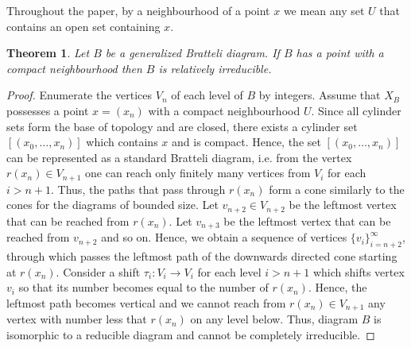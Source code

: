 \documentclass[11pt, twoside]{amsart}
\theoremstyle{definition}
\theoremstyle{remark}
\theoremstyle{plain}
\newtheorem{thm}[definition]{Theorem}
\numberwithin{equation}{section}
\begin{document}
Throughout the paper, by a neighbourhood of a point $x$ we mean any set $U$ that contains an open set containing $x$.

\begin{thm}\label{Thm:isomredus}
    Let $B$ be a generalized Bratteli diagram. 
    If $B$ has a point with a compact neighbourhood then $B$ is relatively irreducible. 
    
\end{thm}

\begin{proof} %
Enumerate the vertices $V_n$ of each level of $B$ by integers. Assume that $X_B$ possesses a point $x = (x_n)$ with a compact neighbourhood $U$. Since all cylinder sets form the base of topology and are closed, there exists a cylinder set $[(x_0, \ldots, x_n)]$ which contains $x$ and is compact. Hence, the set $[(x_0, \ldots, x_n)]$ can be represented as a standard Bratteli diagram, i.e. from the vertex $r(x_n) \in V_{n+1}$ one can reach only finitely many vertices %
    from $V_{i}$
    for each $i > n + 1$.
    Thus, the paths that pass through $r(x_n)$ form a cone similarly to the cones for the diagrams of bounded size. Let $v_{n + 2} \in V_{n+2}$ be the leftmost vertex that can be reached from $r(x_n)$. Let $v_{n+3}$ be the leftmost vertex that can be reached from $v_{n+2}$ and so on. Hence, we obtain a sequence of vertices $\{v_{i}\}_{i = n+2}^{\infty}$, through which passes the leftmost path of the downwards directed cone starting at $r(x_n)$. Consider a shift $\tau_i \colon V_i \rightarrow V_i$ for each level $i > n + 1$ which shifts vertex $v_i$ so that its number becomes equal to the number of $r(x_n)$. Hence, the leftmost path becomes vertical and we cannot reach from $r(x_n) \in V_{n+1}$ any vertex with number less that $r(x_n)$ on any level below. Thus, diagram $B$ is isomorphic to a reducible diagram and cannot be completely irreducible.
\end{proof}
\end{document}
